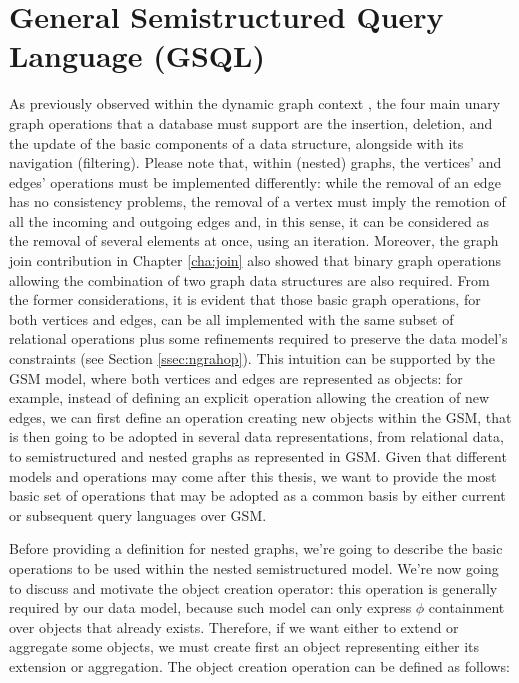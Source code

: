 \section{General Semistructured Query Language (GSQL)}
As previously observed within the dynamic graph context \cite{Demetrescu2010}, the four main unary graph operations that a database must support are the insertion,  deletion, and the update of the basic components of a data structure, alongside with its navigation (filtering). Please note that, within  (nested) graphs, the vertices' and edges' operations must be implemented differently: while the removal of an edge has no consistency problems, the removal of a vertex must imply the remotion of all the incoming and outgoing edges and, in this sense, it can be considered as the removal of several elements at once, using an iteration.  Moreover, the graph join contribution in Chapter \ref{cha:join} also showed that binary graph operations allowing the combination of two graph data structures are also required. From the former considerations, it is evident that those basic graph operations, for both vertices and edges, can be all implemented with the same subset of relational operations plus some refinements required to preserve the data model's constraints (see Section \vref{ssec:ngrahop}). This intuition can be supported by the GSM model, where both vertices and edges are represented as objects: %
for example, instead of defining an explicit operation allowing the creation of new edges, we can first define an operation creating new objects within the GSM, that is then going to be adopted in several data representations, from relational data, to semistructured and nested graphs as represented in GSM. Given that different models and operations may come after this thesis, we want to provide the most basic set of operations that may be adopted  as a common basis by either current or subsequent query languages over GSM. 

Before providing a definition for nested graphs, we're going to describe the basic operations to be used within the nested semistructured model. We're now going to discuss and motivate the object creation operator: this operation is generally required by our data model, because such model can only express $\phi$ containment over objects that already exists. Therefore, if we want either to extend  or aggregate some objects, we must create first an object representing either its extension or  aggregation. The object creation operation can be defined as follows:


